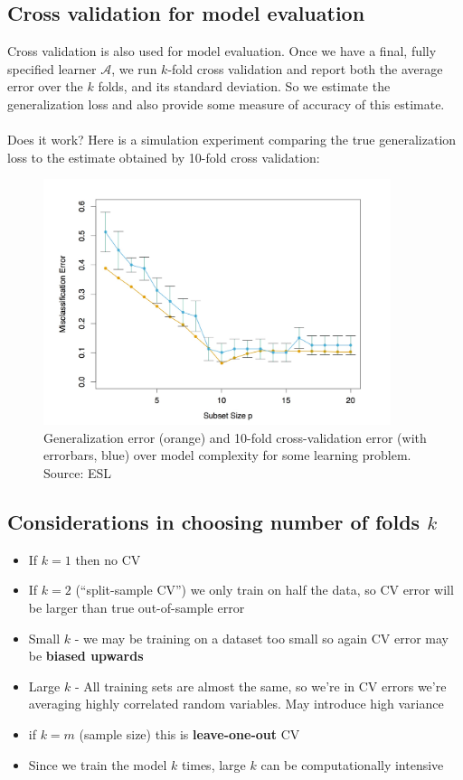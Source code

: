 \documentclass[11pt]{article}
\newcommand{\Ac}{\mathcal{A}}
\begin{document}
  \subsection{Cross validation for model evaluation}
  Cross validation is also used for model evaluation. Once we have a final,
  fully specified learner $\Ac$, we run $k$-fold cross validation and report
  both the average error over the $k$ folds, and its standard deviation. So we
  estimate the generalization loss and also provide some measure of accuracy
  of this estimate. 
\\~\\
Does it work? Here is a simulation experiment comparing the true generalization
loss to the estimate obtained by 10-fold cross validation:
\begin{figure}[H]
  \centering
        \includegraphics[width=4in]{cv_vs_test.jpeg}  
      \caption{
      Generalization error (orange) and 
      10-fold cross-validation error (with errorbars,
    blue) over model complexity for some learning problem. Source: ESL}
\end{figure}



    \subsection{Considerations in choosing number of folds $k$}
      \begin{itemize}
    \item If $k=1$ then no CV
\item If $k=2$ (``split-sample CV'') we only train on half the data, so CV error
  will be larger than true out-of-sample error
\item Small $k$ - we may be training on a dataset too small so again CV error
  may be {\bf biased upwards}
\item Large $k$ - All training sets are almost the same, so we're in CV errors
  we're averaging
  highly correlated random variables. May introduce high variance 
    \item if $k=m$ (sample size) this is {\bf leave-one-out} CV
    \item Since we train the model $k$ times, large $k$ can be computationally
      intensive
  \end{itemize}
 
\end{document}
